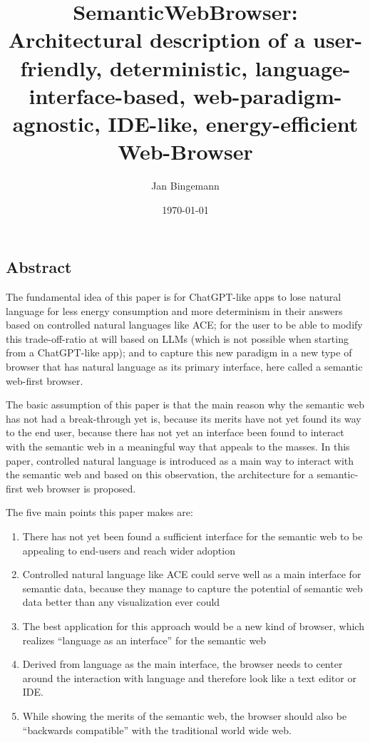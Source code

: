 \documentclass[12pt,a4paper]{article}
\title{SemanticWebBrowser:\\Architectural description of a user-friendly, deterministic, language-interface-based, web-paradigm-agnostic, IDE-like, energy-efficient Web-Browser}
\author{Jan Bingemann}
\date{\today}
\begin{document}
\maketitle

\tableofcontents
\newpage

\subsection*{Abstract}

The fundamental idea of this paper is for ChatGPT-like apps to lose natural language for less energy consumption and more determinism in their answers based on controlled natural languages like ACE; for the user to be able to modify this trade-off-ratio at will based on LLMs (which is not possible when starting from a ChatGPT-like app); and to capture this new paradigm in a new type of browser that has natural language as its primary interface, here called a semantic web-first browser.

The basic assumption of this paper is that the main reason why the semantic web has not had a break-through yet is, because its merits have not yet found its way to the end user, because there has not yet an interface been found to interact with the semantic web in a meaningful way that appeals to the masses. In this paper, controlled natural language is introduced as a main way to interact with the semantic web and based on this observation, the architecture for a semantic-first web browser is proposed.

The five main points this paper makes are:

\begin{enumerate}
    \item There has not yet been found a sufficient interface for the semantic web to be appealing to end-users and reach wider adoption
    \item Controlled natural language like ACE could serve well as a main interface for semantic data, because they manage to capture the potential of semantic web data better than any visualization ever could
    \item The best application for this approach would be a new kind of browser, which realizes ``language as an interface'' for the semantic web
    \item Derived from language as the main interface, the browser needs to center around the interaction with language and therefore look like a text editor or IDE.
    \item While showing the merits of the semantic web, the browser should also be ``backwards compatible'' with the traditional world wide web.
\end{enumerate}
\end{document}
